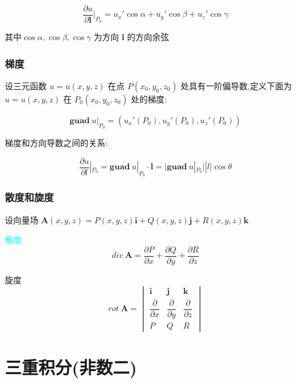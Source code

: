 \begin{theorem}[方向导数计算公式]
	$$\dfrac{\partial u}{\partial \boldsymbol{l}}|_{P_{0}}=u_{x}'\cos \alpha+u_{y}'\cos \beta+u_{z}'\cos \gamma$$
	
	其中$\cos \alpha,\cos \beta,\cos \gamma$ 为方向 $\boldsymbol{l}$ 的方向余弦
\end{theorem}

\subsection{梯度}

\begin{definition}[梯度]
	
	设三元函数 $u=u(x,y,z)$ 在点 $P(x_{0},y_{0},z_{0})$ 处具有一阶偏导数,定义下面为 $u=u(x,y,z)$ 在 $ P_{0}(x_{0},y_{0},z_{0})$ 处的梯度: 
	
	$$\boldsymbol{guad}\ u|_{P_{0}}=(u_{x}'(P_{0}),u_{y}'(P_{0}),u_{z}'(P_{0}))$$
	
	
	梯度和方向导数之间的关系: 

	$$\dfrac{\partial u}{\partial l}|_{P_{0}}=\boldsymbol{guad}\ u|_{P_{0}}\cdot \boldsymbol{l}=\big|\boldsymbol{guad}\ u|_{P_{0}}\big| |l|\cos \theta$$
\end{definition}

\subsection{散度和旋度}

\begin{definition}[散度和旋度]
	设向量场 $\boldsymbol{A}(x,y,z)=P(x,y,z)\boldsymbol{i} + Q(x,y,z)\boldsymbol{j} + R(x,y,z)\boldsymbol{k}$
	
	\textcolor{cyan}{散度} 
	$$div\ \boldsymbol{A}=\dfrac{\partial P}{\partial x}+\dfrac{\partial Q}{\partial y}+\dfrac{\partial R}{\partial z}$$
	
	\textcolor{purplea}{旋度}
	$$rot \ \boldsymbol{A} = 
	\begin{vmatrix}
		\boldsymbol{i} & \boldsymbol{j} & \boldsymbol{k}\\
		\dfrac{\partial}{\partial x} & \dfrac{\partial}{\partial y} & \dfrac{\partial}{\partial z} \\
		P & Q & R
	\end{vmatrix}$$
\end{definition}



\chapter{三重积分(非数二)}


